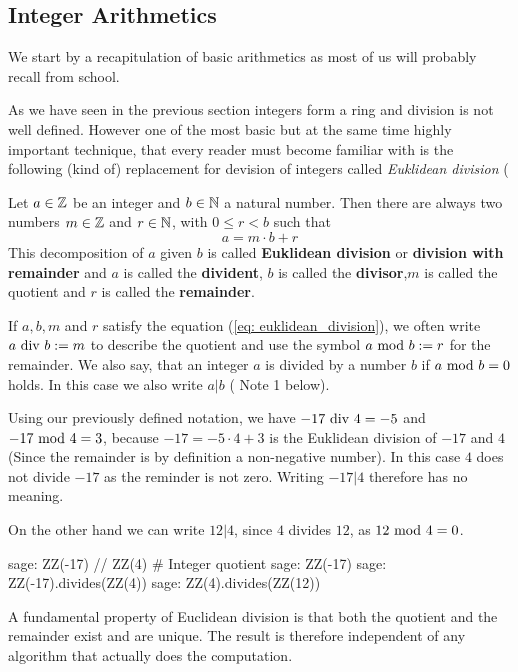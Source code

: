 \subsection{Integer Arithmetics}
\label{integer_arithmetics}
We start by a recapitulation of basic arithmetics as most of us will probably recall from school.

As we have seen in the previous section integers form a ring and division is not well defined. However one of the most basic but at the same time highly important technique, that every reader must become familiar with is the following (kind of) replacement for devision of integers called \textit{Euklidean division} (\cite{AL}
\begin{theorem}
Let $ a \in \mathbb{Z} $ be an integer and $ b \in \mathbb{N} $ a natural number. Then there are always two numbers $ m \in \mathbb{Z} $ and $ r \in \mathbb{N} $, with $ 0 \leq r <b $ such that
\begin{equation}
\label{eq: euklidean_division}
a = m \cdot b + r
\end{equation}
This decomposition of $a$ given $b$ is called \textbf{Euklidean division} or \textbf{division with remainder} and $ a $ is called the \textbf{divident}, $ b $ is called the \textbf{divisor},$m$ is called the quotient and $r$ is called the \textbf{remainder}. 
\end{theorem}
\begin{remark}
\label{eq: euklidean_division_notation}
If $ a, b, m $ and $ r $ satisfy the equation (\ref{eq: euklidean_division}), we often write $ a \text{ div } b: = m $ to describe the quotient and use the symbol $ a \text{ mod } b: = r $ for the remainder. We also say, that an integer $ a $ is divided by a number $ b $ if $ a \text{ mod } b = 0 $ holds. In this case we also write $ a | b $ (\cite{AL} Note 1 below).
\end{remark}
\begin{example}
Using our previously defined notation, we have $ -17 \text{ div } 4 = - 5 $ and $ -17 \text{ mod } 4 = 3 $, because $ -17 = -5 \cdot 4 + 3 $  is the Euklidean division of $-17$ and $4$ (Since the remainder is by definition a non-negative number). In this case $4$ does not divide $-17$ as the reminder is not zero. Writing $-17 | 4$ therefore has no meaning.

On the other hand we can write $12 | 4$, since $4$ divides $12$, as $ 12 \text{ mod } 4 = 0 $.

\begin{sagecommandline}
sage: ZZ(-17) // ZZ(4) # Integer quotient 
sage: ZZ(-17) %
sage: ZZ(-17).divides(ZZ(4))
sage: ZZ(4).divides(ZZ(12))
\end{sagecommandline}
\end{example}
A fundamental property of Euclidean division is that both the quotient and the remainder exist and are unique. The result is therefore independent of any algorithm that actually does the computation.

